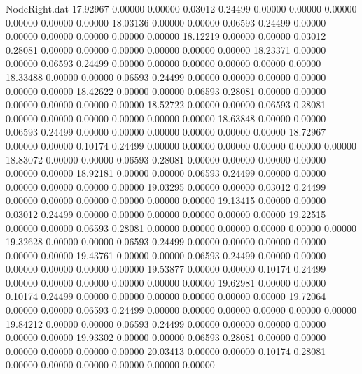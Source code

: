 \begin{filecontents}{NodeRight.dat}
  17.92967    0.00000    0.00000     0.03012    0.24499    0.00000    0.00000    0.00000    0.00000    0.00000    0.00000
  18.03136    0.00000    0.00000     0.06593    0.24499    0.00000    0.00000    0.00000    0.00000    0.00000    0.00000
  18.12219    0.00000    0.00000     0.03012    0.28081    0.00000    0.00000    0.00000    0.00000    0.00000    0.00000
  18.23371    0.00000    0.00000     0.06593    0.24499    0.00000    0.00000    0.00000    0.00000    0.00000    0.00000
  18.33488    0.00000    0.00000     0.06593    0.24499    0.00000    0.00000    0.00000    0.00000    0.00000    0.00000
  18.42622    0.00000    0.00000     0.06593    0.28081    0.00000    0.00000    0.00000    0.00000    0.00000    0.00000
  18.52722    0.00000    0.00000     0.06593    0.28081    0.00000    0.00000    0.00000    0.00000    0.00000    0.00000
  18.63848    0.00000    0.00000     0.06593    0.24499    0.00000    0.00000    0.00000    0.00000    0.00000    0.00000
  18.72967    0.00000    0.00000     0.10174    0.24499    0.00000    0.00000    0.00000    0.00000    0.00000    0.00000
  18.83072    0.00000    0.00000     0.06593    0.28081    0.00000    0.00000    0.00000    0.00000    0.00000    0.00000
  18.92181    0.00000    0.00000     0.06593    0.24499    0.00000    0.00000    0.00000    0.00000    0.00000    0.00000
  19.03295    0.00000    0.00000     0.03012    0.24499    0.00000    0.00000    0.00000    0.00000    0.00000    0.00000
  19.13415    0.00000    0.00000     0.03012    0.24499    0.00000    0.00000    0.00000    0.00000    0.00000    0.00000
  19.22515    0.00000    0.00000     0.06593    0.28081    0.00000    0.00000    0.00000    0.00000    0.00000    0.00000
  19.32628    0.00000    0.00000     0.06593    0.24499    0.00000    0.00000    0.00000    0.00000    0.00000    0.00000
  19.43761    0.00000    0.00000     0.06593    0.24499    0.00000    0.00000    0.00000    0.00000    0.00000    0.00000
  19.53877    0.00000    0.00000     0.10174    0.24499    0.00000    0.00000    0.00000    0.00000    0.00000    0.00000
  19.62981    0.00000    0.00000     0.10174    0.24499    0.00000    0.00000    0.00000    0.00000    0.00000    0.00000
  19.72064    0.00000    0.00000     0.06593    0.24499    0.00000    0.00000    0.00000    0.00000    0.00000    0.00000
  19.84212    0.00000    0.00000     0.06593    0.24499    0.00000    0.00000    0.00000    0.00000    0.00000    0.00000
  19.93302    0.00000    0.00000     0.06593    0.28081    0.00000    0.00000    0.00000    0.00000    0.00000    0.00000
  20.03413    0.00000    0.00000     0.10174    0.28081    0.00000    0.00000    0.00000    0.00000    0.00000    0.00000

\end{filecontents}
